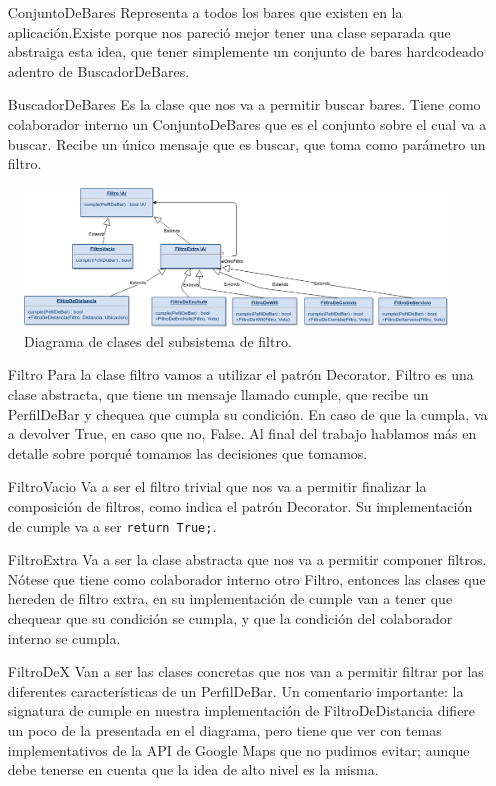 \begin{itemize}
\item[ConjuntoDeBares] Representa a todos los bares que existen en la aplicación.Existe porque nos pareció mejor tener una clase separada que abstraiga esta idea, que tener simplemente un conjunto de bares hardcodeado adentro de BuscadorDeBares.

\item[BuscadorDeBares] Es la clase que nos va a permitir buscar bares. Tiene como colaborador interno un ConjuntoDeBares que es el conjunto sobre el cual va a buscar. Recibe un único mensaje que es buscar, que toma como parámetro un filtro.
\end{itemize}


\begin{figure}[H]
  \centering
  \includegraphics[width=\textwidth]{diagramas/filtro_clases.png}
  \caption{\normalfont Diagrama de clases del subsistema de filtro.}
\end{figure}

\begin{itemize}
\item[Filtro] Para la clase filtro vamos a utilizar el patrón Decorator. Filtro es una clase abstracta, que tiene un mensaje llamado cumple, que recibe un PerfilDeBar y chequea que cumpla su condición. En caso de que la cumpla, va a devolver True, en caso que no, False. Al final del trabajo hablamos más en detalle sobre porqu\'e tomamos las decisiones que tomamos.

\item[FiltroVacio] Va a ser el filtro trivial que nos va a permitir finalizar la composición de filtros, como indica el patrón Decorator. Su implementación de cumple va a ser \texttt{return True;}.

\item[FiltroExtra] Va a ser la clase abstracta que nos va a permitir componer filtros. Nótese que tiene como colaborador interno otro Filtro, entonces las clases que hereden de filtro extra, en su implementación de cumple van a tener que chequear que su condición se cumpla, y que la condición del colaborador interno se cumpla.

\item[FiltroDeX] Van a ser las clases concretas que nos van a permitir filtrar por las diferentes características de un PerfilDeBar. Un comentario importante: la signatura de cumple en nuestra implementación de FiltroDeDistancia difiere un poco de la presentada en el diagrama, pero tiene que ver con temas implementativos de la API de Google Maps que no pudimos evitar; aunque debe tenerse en cuenta que la idea de alto nivel es la misma.
\end{itemize}

